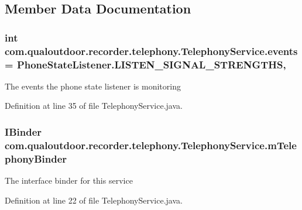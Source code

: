 \subsection{Member Data Documentation}
\hypertarget{classcom_1_1qualoutdoor_1_1recorder_1_1telephony_1_1TelephonyService_ab8b427dc82941cff7a38a14300f42f3c}{
\subsubsection[{events}]{\setlength{\rightskip}{0pt plus 5cm}int com.\-qualoutdoor.\-recorder.\-telephony.\-Telephony\-Service.\-events = Phone\-State\-Listener.\-L\-I\-S\-T\-E\-N\-\_\-\-S\-I\-G\-N\-A\-L\-\_\-\-S\-T\-R\-E\-N\-G\-T\-H\-S\hspace{0.3cm}{\ttfamily [static]}, {\ttfamily [private]}}}\label{classcom_1_1qualoutdoor_1_1recorder_1_1telephony_1_1TelephonyService_ab8b427dc82941cff7a38a14300f42f3c}
The events the phone state listener is monitoring 

Definition at line 35 of file Telephony\-Service.\-java.

\hypertarget{classcom_1_1qualoutdoor_1_1recorder_1_1telephony_1_1TelephonyService_a1d7f4bd289769acd6c35b25a5ef31aed}{
\subsubsection[{m\-Telephony\-Binder}]{\setlength{\rightskip}{0pt plus 5cm}I\-Binder com.\-qualoutdoor.\-recorder.\-telephony.\-Telephony\-Service.\-m\-Telephony\-Binder\hspace{0.3cm}{\ttfamily [private]}}}\label{classcom_1_1qualoutdoor_1_1recorder_1_1telephony_1_1TelephonyService_a1d7f4bd289769acd6c35b25a5ef31aed}
The interface binder for this service 

Definition at line 22 of file Telephony\-Service.\-java.


